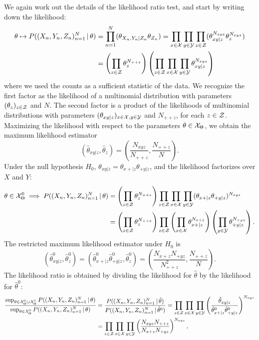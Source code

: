 We again work out the details of the likelihood ratio test, and start by writing down the likelihood:
\begin{equation*}\begin{split}
  \theta \mapsto P((X_n,Y_n,Z_n)_{n=1}^N \operatorname*{|} \theta) 
  &= \prod_{n=1}^N (\theta_{X_n,Y_n|Z_n} \theta_{Z_n}) 
   = \prod_{x\in\mathcal{X}} \prod_{y\in\mathcal{Y}} \prod_{z\in\mathcal{Z}} (\theta_{xy|z}^{N_{xyz}} \theta_z^{N_{xyz}}) \\
  &= \left( \prod_{z \in \mathcal{Z}} \theta_z^{N_{+ + z}} \right) \left(\prod_{z \in \mathcal{Z}}\prod_{x\in\mathcal{X}} \prod_{y\in\mathcal{Y}} \theta_{xy|z}^{N_{xyz}}\right)
\end{split}\end{equation*}
where we used the counts as a sufficient statistic of the data. 
We recognize the first factor as the likelihood of a multinomial
distribution with parameters $(\theta_z)_{z\in\mathcal{Z}}$ and $N$.
The second factor is a product of the likelihoods
of multinomial distributions with parameters $(\theta_{xy|z})_{x\in\mathcal{X},y\in\mathcal{Y}}$ and $N_{++ z}$,
for each $z \in \mathcal{Z}$.
Maximizing the likelihood with respect to the parameters $\theta \in \mathcal{X}_\Theta$, we obtain the maximum likelihood estimator
$$\left(\hat \theta_{xy|z},\hat \theta_z\right) = \left(\frac{N_{xyz}}{N_{++ z}},\frac{N_{++ z}}{N}\right).$$
Under the null hypothesis $H_0$, $\theta_{xy|z} = \theta_{x+|z}\theta_{+ y|z}$, and the likelihood factorizes over $X$
and $Y$:
\begin{equation*}\begin{split}
  \theta \in \mathcal{X}_\Theta^0 \implies P((X_n,Y_n,Z_n)_{n=1}^N \operatorname*{|} \theta) 
  &= \left( \prod_{z \in \mathcal{Z}} \theta_z^{N_{+ + z}} \right) \prod_{z \in \mathcal{Z}}\prod_{x\in\mathcal{X}} \prod_{y\in\mathcal{Y}} (\theta_{x+|z} \theta_{+ y|z})^{N_{xyz}} \\
  &= \left( \prod_{z \in \mathcal{Z}} \theta_z^{N_{+ + z}} \right) \prod_{z \in \mathcal{Z}} \left(\prod_{x\in\mathcal{X}} \theta_{x+|z}^{N_{x+ z}} \right) \left(\prod_{y\in\mathcal{Y}} \theta_{+ y|z}^{N_{+ yz}} \right).
\end{split}\end{equation*}
The restricted maximum likelihood estimator under $H_0$ is 
$$\left(\hat \theta^0_{xy|z},\hat \theta^0_z\right) = \left(\hat \theta^0_{x+|z} \hat \theta^0_{+ y|z},\hat \theta^0_z\right) = \left(\frac{N_{x+ z} N_{+ y z}}{N_{++ z}^2},\frac{N_{++ z}}{N}\right).$$
The likelihood ratio is obtained by dividing the likelihood for $\hat \theta$ by the likelihood for $\hat \theta^0$:
\begin{equation*}\begin{split}
\frac{\sup_{\theta\in\mathcal{X}_\Theta^0\cup\mathcal{X}_\Theta^1} P((X_n,Y_n,Z_n)_{n=1}^N \operatorname*{|} \theta)}{\sup_{\theta\in\mathcal{X}_\Theta^0} P((X_n,Y_n,Z_n)_{n=1}^N \operatorname*{|} \theta)}
  & = \frac{P((X_n,Y_n,Z_n)_{n=1}^N \operatorname*{|} \hat\theta)}{P((X_n,Y_n,Z_n)_{n=1}^N \operatorname*{|} \hat\theta^0)}
    = \prod_{z\in\mathcal{Z}} \prod_{x\in\mathcal{X}} \prod_{y\in\mathcal{Y}} \left(\frac{\hat \theta_{xy|z}}{\hat \theta^0_{x+|z} \hat \theta^0_{+ y|z}}\right)^{N_{xyz}} \\
  & = \prod_{z\in\mathcal{Z}} \prod_{x\in\mathcal{X}} \prod_{y\in\mathcal{Y}} \left(\frac{N_{xyz} N_{++ z}}{N_{x+ z} N_{+ y z}}\right)^{N_{xyz}},
\end{split}\end{equation*}

